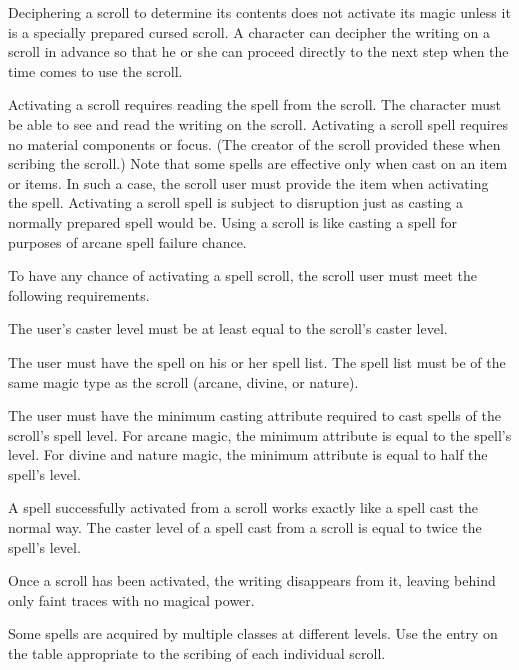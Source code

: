 Deciphering a scroll to determine its contents does not activate its magic unless it is a specially prepared cursed scroll. A character can decipher the writing on a scroll in advance so that he or she can proceed directly to the next step when the time comes to use the scroll.

 Activating a scroll requires reading the spell from the scroll. The character must be able to see and read the writing on the scroll. Activating a scroll spell requires no material components or focus. (The creator of the scroll provided these when scribing the scroll.) Note that some spells are effective only when cast on an item or items. In such a case, the scroll user must provide the item when activating the spell. Activating a scroll spell is subject to disruption just as casting a normally prepared spell would be. Using a scroll is like casting a spell for purposes of arcane spell failure chance.

To have any chance of activating a spell scroll, the scroll user must meet the following requirements.
\begin{itemize*}
    \item The user's caster level must be at least equal to the scroll's caster level.
    \item The user must have the spell on his or her spell list. The spell list must be of the same magic type as the scroll (arcane, divine, or nature).
    \item The user must have the minimum casting attribute required to cast spells of the scroll's spell level. For arcane magic, the minimum attribute is equal to the spell's level. For divine and nature magic, the minimum attribute is equal to half the spell's level.
\end{itemize*}

 A spell successfully activated from a scroll works exactly like a spell cast the normal way. The caster level of a spell cast from a scroll is equal to twice the spell's level.

Once a scroll has been activated, the writing disappears from it, leaving behind only faint traces with no magical power.

 Some spells are acquired by multiple classes at different levels. Use the entry on the table appropriate to the scribing of each individual scroll.

